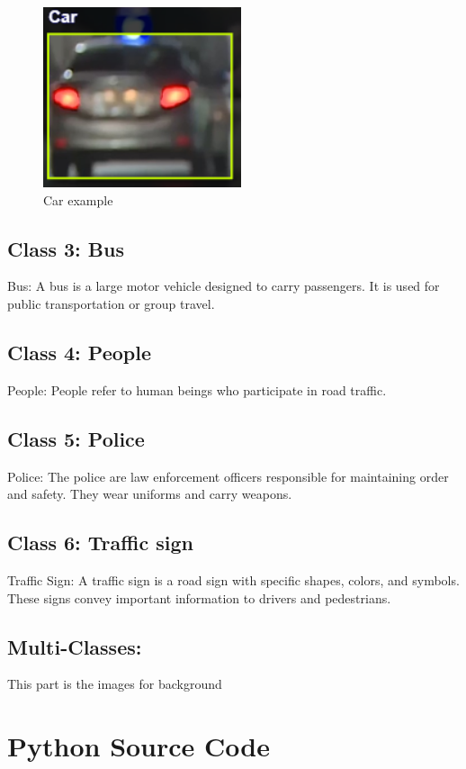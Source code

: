 \documentclass[a4paper,11pt]{article}
\theoremstyle{mytheor}
\begin{document}
 \begin{figure}
     \centering
     \includegraphics[width=0.5\linewidth]{images/car1.png}
     \caption{Car example}
     \label{fig:enter-label}
 \end{figure}
\subsection{Class 3: Bus}
Bus: A bus is a large motor vehicle designed to carry passengers. It is used for public transportation or group travel. 
 
\subsection{Class 4: People}
People: People refer to human  beings who  participate in road traffic.

 
\subsection{Class 5: Police}
Police: The police are law enforcement officers responsible for maintaining order and safety. They wear uniforms and carry weapons. 

\subsection{Class 6: Traffic sign}
Traffic Sign: A traffic sign is a road sign with specific shapes, colors, and symbols. These signs convey important information to drivers and pedestrians.  

\subsection{Multi-Classes:}
This part is the images for background

\section{Python Source Code}
\end{document}
